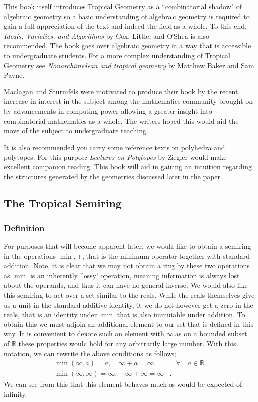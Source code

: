 \documentclass[12pt,a4paper]{amsart}
\newcommand{\R}{\mathbb{R}}
\theoremstyle{definition}
\theoremstyle{remark}
\begin{document}
This book itself introduces Tropical Geometry as a ``combinatorial shadow" of algebraic geometry so a basic understanding of algebraic geometry is required to gain  a full appreciation of the text and indeed the field as a whole.
To this end, \textit{Ideals, Varieties, and Algorithms}\cite{CoxDavid2007IVaA} by Cox, Little, and O’Shea is also recommended. The book goes over algebraic geometry in a way that is accessible to undergraduate students.
For a more complex understanding of Tropical Geometry see \textit{Nonarchimedean and tropical geometry}\cite{baker2016nonarchimedean} by Matthew Baker and Sam Payne.

Maclagan and Sturmfels were motivated to produce their book by the recent increase in interest in the subject among the mathematics community brought on by advancements in computing power allowing a greater insight into combinatorial mathematics as a whole. The writers hoped this would aid the move of the subject to undergraduate teaching.

It is also recommended you carry some reference texts on polyhedra and polytopes.
For this purpose \textit{Lectures on Polytopes}\cite{ZieglerGunterM1995Lop} by Ziegler would make excellent companion reading. This book will aid in gaining an intuition regarding the structures generated by the geometries discussed later in the paper.

\subsection{The Tropical Semiring}
\subsubsection{Definition}
For purposes that will become apparent later, we would like to obtain a semiring in the operations $\min, +$, that is the minimum operator together with standard addition. Note, it is clear that we may not obtain a ring by these two operations as $\min$ is an inherently 'lossy' operation, meaning information is always lost about the operands, and thus it can have no general inverse. We would also like this semiring to act over a set similar to the reals. While the reals themselves give us a unit in the standard additive identity, $0$, we do not however get a zero in the reals, that is an identity under $\min$ that is also immutable under addition. To obtain this we must adjoin an additional element to our set that is defined in this way. It is convenient to denote such an element with $\infty$ as on a bounded subset of $\R$ these properties would hold for any arbitrarily large number. With this notation, we can rewrite the above conditions as follows;
\begin{equation}
    \begin{aligned}
        \min(\infty, a) = a,\quad \infty + a = \infty&\quad\forall\quad a\in\R \\
        \min(\infty, \infty) = \infty,\quad \infty + \infty = \infty&.
    \end{aligned}
\end{equation}
We can see from this that this element behaves much as would be expected of infinity.
\end{document}
